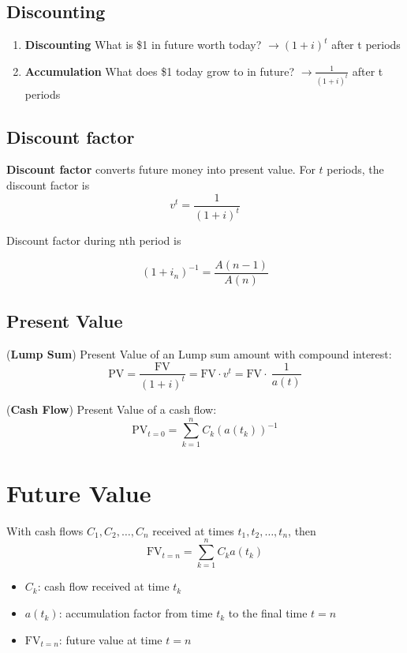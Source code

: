 \subsection{Discounting}

\begin{comments}
    \begin{enumerate}
        \item \textbf{Discounting} What is \$1 in future worth today? $\rightarrow (1+i)^t$ after t periods
        \item \textbf{Accumulation} What does \$1 today grow to in future? $\rightarrow \frac{1}{(1+i)^t}$ after t periods
    \end{enumerate}
\end{comments}

\subsection{Discount factor}

\begin{definition}
    \textbf{Discount factor} converts future money into present value. For $t$ periods, 
    the discount factor is 
    \[
        v^t = \frac{1}{(1+i)^t}
    \]  

    Discount factor during nth period is

    \[
    (1+i_n)^{-1} = \frac{A(n-1)}{A(n)}
    \]
\end{definition}


\subsection{Present Value}

\begin{definition}
    (\textbf{Lump Sum}) Present Value of an Lump sum amount with compound interest: 
    \[
        \text{PV} = \frac{\text{FV}}{(1+i)^{t}} = \text{FV} \cdot v^t = \text{FV} \cdot \ \frac{1}{a(t)}
    \]  
\end{definition}
   

\begin{definition}
    (\textbf{Cash Flow}) Present Value of a cash flow: 
    \[
        \text{PV}_{t=0} = \sum_{k=1}^{n} C_k (a(t_k))^{-1}
    \]
\end{definition}

\section{Future Value}
\begin{definition}
    With cash flows $C_1, C_2, \dots, C_n$ received at times $t_1, t_2, \dots, t_n$, then
    \[
        \text{FV}_{t=n} = \sum_{k=1}^{n} C_k a(t_k)
    \]
    \begin{itemize}
        \item $C_k$: cash flow received at time $t_k$
        \item $a(t_k)$: accumulation factor from time $t_k$ to the final time $t=n$
        \item $\text{FV}_{t=n}$: future value at time $t=n$
    \end{itemize}
\end{definition}


